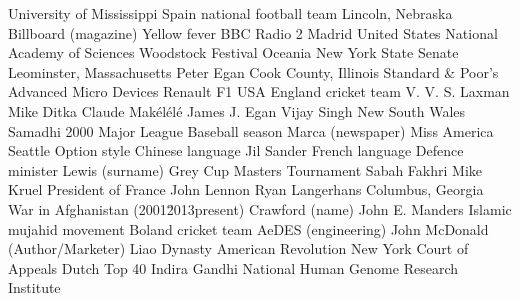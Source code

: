 University of Mississippi  Spain national football team  Lincoln, Nebraska  
Billboard (magazine)  Yellow fever  BBC Radio 2  
Madrid  United States National Academy of Sciences  Woodstock Festival  
Oceania  New York State Senate  Leominster, Massachusetts  
Peter Egan  Cook County, Illinois  Standard & Poor's  
Advanced Micro Devices  Renault F1  USA  
England cricket team  V. V. S. Laxman  Mike Ditka  
Claude Makélélé  James J. Egan  Vijay Singh  
New South Wales  Samadhi  2000 Major League Baseball season  
Marca (newspaper)  Miss America  Seattle  
Option style  Chinese language  Jil Sander  
French language  Defence minister  Lewis (surname)  
Grey Cup  Masters Tournament  Sabah Fakhri  
Mike Kruel  President of France  John Lennon  
Ryan Langerhans  Columbus, Georgia  War in Afghanistan (2001\u2013present)  
Crawford (name)  John E. Manders  Islamic mujahid movement  
Boland cricket team  AeDES (engineering)  John McDonald (Author/Marketer)  
Liao Dynasty  American Revolution  New York Court of Appeals  
Dutch Top 40  Indira Gandhi  National Human Genome Research Institute  
